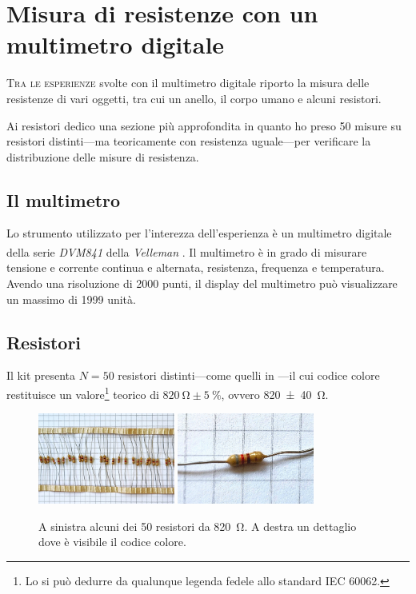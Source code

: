 \chapter{Misura di resistenze con un multimetro digitale}\label{ch:mult}
    \lettrine[loversize=0.08, lines=2]{T}{ra le esperienze} svolte con il multimetro digitale riporto la misura delle resistenze di vari oggetti, tra cui un anello, il corpo umano e alcuni resistori.

    Ai resistori dedico una sezione più approfondita in quanto ho preso \num{50} misure su resistori distinti---ma teoricamente con resistenza uguale---per verificare la distribuzione delle misure di resistenza.

    \section{Il multimetro}
        Lo strumento utilizzato per l'interezza dell'esperienza è un multimetro digitale della serie \emph{DVM841} della \emph{Velleman\textsuperscript{\textregistered}} \cite{velleman-dvm841}. Il multimetro è in grado di misurare tensione e corrente continua e alternata, resistenza, frequenza e temperatura. Avendo una risoluzione di \num{2000} punti, il display del multimetro può visualizzare un massimo di \num{1999} unità.

    \section{Resistori}\label{s:mul:resistori}
        Il kit presenta $N = \num{50}$ resistori distinti---come quelli in ---il cui codice colore restituisce un valore\footnote{Lo si può dedurre da qualunque legenda fedele allo standard IEC 60062.} teorico di $\SI{820}{\ohm} \pm \SI{5}{\%}$, ovvero \SI{820(40)}{\ohm}.
        \begin{figure}
            \centering
            \includegraphics[width=0.4\textwidth]{images/multimetro/resistori.jpg}
            \hspace{0.05\textwidth}
            \includegraphics[width=0.4\textwidth]{images/multimetro/resistore.jpg}
            \caption{A sinistra alcuni dei \num{50} resistori da \SI{820}{\ohm}. A destra un dettaglio dove è visibile il codice colore.}
            \label{fig:mul:resistore}
        \end{figure}

